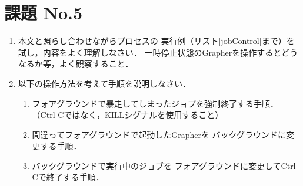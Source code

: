 \section*{課題 No.5}
\begin{enumerate}
\item 本文と照らし合わせながらプロセスの
実行例（リスト\ref{jobControl}まで）を試し，内容をよく理解しなさい．
一時停止状態のGrapherを操作するとどうなるか等，よく観察すること．

\item 以下の操作方法を考えて手順を説明しなさい．

\begin{enumerate}
\item フォアグラウンドで暴走してしまったジョブを強制終了する手順．
（Ctrl-Cではなく，KILLシグナルを使用すること）

\item 間違ってフォアグラウンドで起動したGrapherを
バックグラウンドに変更する手順．

\item バックグラウンドで実行中のジョブを
フォアグラウンドに変更してCtrl-Cで終了する手順．
\end{enumerate}

\end{enumerate}
